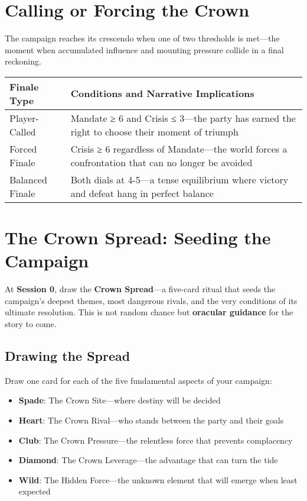 \section*{Calling or Forcing the Crown}

The campaign reaches its crescendo when one of two thresholds is met---the moment when accumulated influence and mounting pressure collide in a final reckoning.

\begin{fatebox}
\begin{tabularx}{\textwidth}{lX}
\toprule
\textbf{Finale Type} & \textbf{Conditions and Narrative Implications} \\
\midrule
Player-Called & Mandate ≥ 6 and Crisis ≤ 3---the party has earned the right to choose their moment of triumph \\
Forced Finale & Crisis ≥ 6 regardless of Mandate---the world forces a confrontation that can no longer be avoided \\
Balanced Finale & Both dials at 4-5---a tense equilibrium where victory and defeat hang in perfect balance \\
\bottomrule
\end{tabularx}
\end{fatebox}

\section*{The Crown Spread: Seeding the Campaign}

At \textbf{Session 0}, draw the \textbf{Crown Spread}---a five-card ritual that seeds the campaign's deepest themes, most dangerous rivals, and the very conditions of its ultimate resolution. This is not random chance but \textbf{oracular guidance} for the story to come.

\subsection*{Drawing the Spread}

Draw one card for each of the five fundamental aspects of your campaign:

\begin{itemize}
    \item \textbf{Spade}: The Crown Site---where destiny will be decided
    \item \textbf{Heart}: The Crown Rival---who stands between the party and their goals
    \item \textbf{Club}: The Crown Pressure---the relentless force that prevents complacency
    \item \textbf{Diamond}: The Crown Leverage---the advantage that can turn the tide
    \item \textbf{Wild}: The Hidden Force---the unknown element that will emerge when least expected
\end{itemize}

